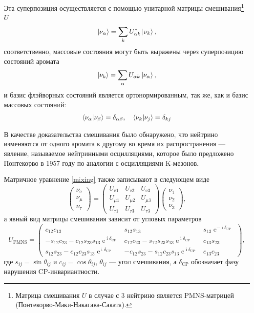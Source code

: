 \documentclass[12pt]{article}
\DeclareMathOperator{\Exp}{e}
\DeclareMathOperator\Iunit{i}
\renewcommand\exp\Exp
\renewcommand\imath\Iunit
\begin{document}
Эта суперпозиция осуществляется с помощью унитарной матрицы смешивания\footnote
{Матрица смешивания $U$ в случае с 3 нейтрино является PMNS-матрицей
  (Понтекорво-Маки-Накагава-Саката).} $U$
\begin{equation}\label{mixing}
  \ket{\nu_{\alpha}} = \sum_{k} U^*_{\alpha k} \ket{\nu_{k}}, 
\end{equation}
соответственно, массовые состояния могут быть выражены через суперпозицию
состояний аромата
\begin{equation}
  \ket{\nu_{k}} = \sum_{\alpha} U_{\alpha k} \ket{\nu_{\alpha}},
\end{equation}
и базис флэйворных состояний является ортонормированным, так же, как и базис
массовых состояний:
\begin{equation}
  \braket{\nu_{\alpha}|\nu_{\beta}} = \delta_{\alpha\beta},
  \quad
  \braket{\nu_{k}|\nu_{j}}=\delta_{kj}
\end{equation}
	
В качестве доказательства смешивания было обнаружено, что нейтрино изменяются от
одного аромата к другому во время их распространения — явление, называемое
нейтринными осцилляциями, которое было предложено Понтекорво в 1957 году по
аналогии с осцилляциями K-мезонов.

Матричное уравнение \eqref{mixing} также записывают в следующем виде
\begin{equation}
  \begin{pmatrix}
	\nu_{\text{e}}\\
	\nu_{\mu}\\
	\nu_{\tau}
  \end{pmatrix}
  =
  \begin{pmatrix}
	U_{\text{e}1}& U_{\text{e}2}& U_{\text{e}3}\\
	U_{\mu1}& U_{\mu2}& U_{\mu3}\\
	U_{\tau1}& U_{\tau3}& U_{\tau3}
  \end{pmatrix}
  \begin{pmatrix}
	\nu_{1}\\
	\nu_{2}\\
	\nu_{3}
  \end{pmatrix},
\end{equation}
а явный вид матрицы смешивания зависит от угловых параметров
\begin{equation}
  U_{\text{PMNS}}=
  \begin{pmatrix}
    c_{12}c_{13}& s_{12}s_{13}& s_{13}\exp^{-\imath\delta_{\text{CP}}}\\
    -s_{12}c_{23} - c_{12}s_{23}s_{13}\exp^{\imath\delta_{\text{CP}}}&
    c_{12}c_{23} - s_{12}s_{23}s_{13}\exp^{\imath\delta_{\text{CP}}}& c_{13}s_{23}\\
    s_{12}s_{23}-c_{12}c_{23}s_{13}\exp^{\imath\delta_{\text{CP}}}&
    -c_{12}s_{23}-s_{12}c_{23}s_{13}\exp^{\imath\delta_{\text{CP}}}& c_{13}c_{23}
  \end{pmatrix},
\end{equation}
где $s_{ij}=\sin{\theta_{ij}}$ и $c_{ij}=\cos{\theta_{ij}}$, $\theta_{ij}$ —
угол смешивания, а $\delta_{\text{CP}}$ обозначает фазу нарушения
\(\text{CP}\)-инвариантности.
\end{document}
